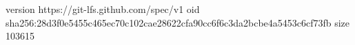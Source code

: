 version https://git-lfs.github.com/spec/v1
oid sha256:28d3f0e5455c465ec70c102cae28622cfa90cc6f6c3da2bcbe4a5453c6cf73fb
size 103615

